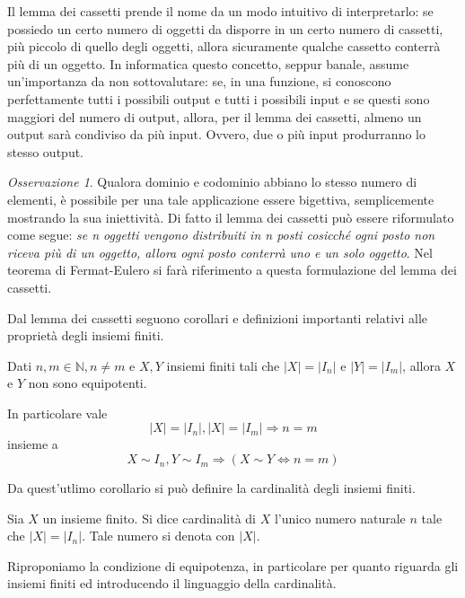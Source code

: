 \documentclass[oneside]{book}
\theoremstyle{remark}
\newtheorem*{osservaz}{Osservazione}
\begin{document}
Il lemma dei cassetti prende il nome da un modo intuitivo di interpretarlo:
se possiedo un certo numero di oggetti da disporre in un certo numero di
cassetti, più piccolo di quello degli oggetti, allora sicuramente qualche
cassetto conterrà più di un oggetto.
In informatica questo concetto, seppur banale, assume un'importanza da non
sottovalutare: se, in una funzione, si conoscono perfettamente tutti i possibili output e
tutti i possibili input e se questi sono maggiori del numero di output,
allora, per il lemma dei cassetti, almeno un output sarà condiviso da più
input. Ovvero, due o più input produrranno lo stesso output.

\begin{osservaz}
Qualora dominio e codominio abbiano lo stesso numero di elementi,
è possibile per una tale applicazione essere bigettiva, semplicemente
mostrando la sua iniettività. Di fatto il lemma dei cassetti può essere
riformulato come segue: \emph{se n oggetti vengono distribuiti in n posti
cosicché ogni posto non riceva più di un oggetto, allora ogni posto
conterrà uno e un solo oggetto}. Nel teorema di Fermat-Eulero
si farà riferimento a questa formulazione del
lemma dei cassetti.
\end{osservaz}

Dal lemma dei cassetti seguono corollari e definizioni importanti
relativi alle proprietà degli insiemi finiti.
\begin{tcolorbox}[colback=green!30, colframe=green!30!black, title={Equipotenza tra insiemi finiti}]
Dati $n,m\in\mathbb{N}, n\not=m$ e $X,Y$ insiemi finiti tali che $|X|=|I_n|$ e $|Y|=|I_m|$,
allora $X$ e $Y$ non sono equipotenti.

In particolare vale \[ |X|=|I_n|,|X|=|I_m| \Longrightarrow n=m \]
insieme a \[ X\sim I_n,Y\sim I_m \Longrightarrow (X\sim Y \Leftrightarrow n = m) \]
\end{tcolorbox}
Da quest'utlimo corollario si può definire la cardinalità degli insiemi
finiti.

\begin{tcolorbox}[colback=yellow!30, colframe=yellow!30!black, title={Cardinalità di un insieme finito}]
Sia $X$ un insieme finito. Si dice cardinalità di $X$ l'unico numero
naturale $n$ tale che $|X|=|I_n|$. Tale numero si denota con $|X|$.
\end{tcolorbox}

Riproponiamo la condizione di equipotenza, in particolare per quanto
riguarda gli insiemi finiti ed introducendo il linguaggio della cardinalità.
\end{document}
